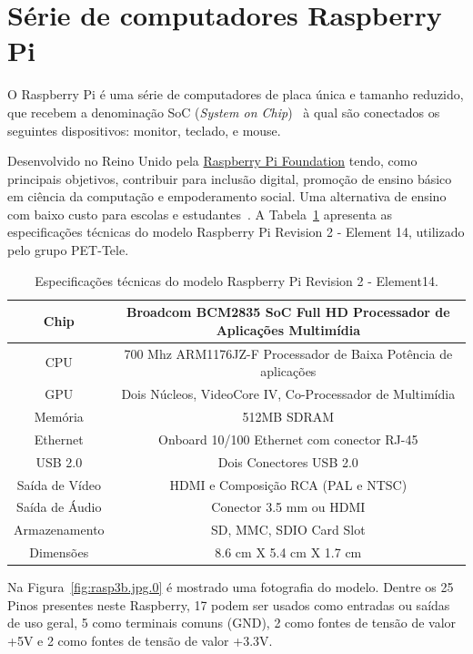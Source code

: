 \documentclass[12pt,a4paper,oneside]{book}
\begin{document}
\section {Série de computadores Raspberry Pi}
%
O Raspberry Pi é uma série de computadores de placa única e tamanho reduzido, que recebem a denominação  SoC (\textit{System on Chip})~\cite{url:soc} à qual são conectados os seguintes dispositivos: monitor, teclado, e mouse. 

Desenvolvido no Reino Unido pela \href{https://www.raspberrypi.org/}{Raspberry Pi Foundation} tendo, como principais objetivos, contribuir para inclusão digital, promoção de ensino básico em ciência da computação e empoderamento social. Uma alternativa de ensino com baixo custo para escolas e estudantes~\cite{url:raspberry_wiki}. A Tabela~\ref{tab:Especificacoes} apresenta as especificações técnicas do modelo Raspberry Pi Revision 2 - Element 14, utilizado pelo grupo PET-Tele. 
%
\begin{table}[!htbp]
    \centering
    \begin{tabular}{ |c|c| } 
        \hline
        Chip & Broadcom BCM2835 SoC Full HD Processador de Aplicações Multimídia\\
        \hline
        CPU & 700 Mhz ARM1176JZ-F Processador de Baixa Potência de aplicações \\
        \hline
        GPU & Dois Núcleos, VideoCore IV, Co-Processador de Multimídia \\ 
        \hline
        Memória & 512MB SDRAM  \\
        \hline
        Ethernet & Onboard 10/100 Ethernet com conector RJ-45 \\
        \hline
        USB 2.0 & Dois Conectores USB 2.0 \\ 
        \hline
        Saída de Vídeo & HDMI e Composição RCA (PAL e NTSC) \\ 
        \hline
        Saída de Áudio & Conector 3.5 mm ou HDMI \\
        \hline
        Armazenamento & SD, MMC, SDIO Card Slot \\
        \hline
        Dimensões & 8.6 cm X 5.4 cm X 1.7 cm \\ 
        \hline
    \end{tabular}
    \caption{Especificações técnicas do modelo Raspberry Pi Revision 2 - Element14.}
    \label{tab:Especificacoes}
\end{table}

\pagebreak

Na Figura~\ref{fig:rasp3b.jpg.0} é mostrado uma fotografia do modelo. 
Dentre os 25 Pinos presentes neste Raspberry, 17 podem ser usados como entradas ou saídas de uso geral, 5 como terminais comuns (GND), 2 como fontes de tensão de valor +5V e 2 como fontes de tensão de valor +3.3V. 
\end{document}
